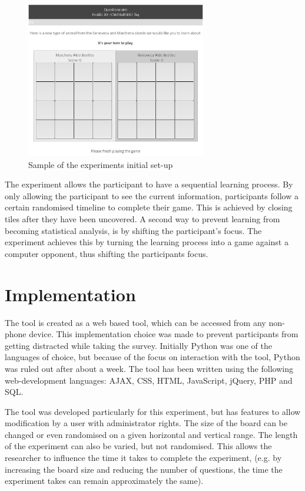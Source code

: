 \documentclass[twoside]{uva-inf-bachelor-thesis}
\theoremstyle{definition}
\begin{document}
\begin{figure}[h]
    \centering
    \includegraphics[width=0.7\textwidth]{Project/Thesis/LaTeX/images/uva_gen_example1.JPG}
    \caption{Sample of the experiments initial set-up}
    \label{fig:example_initiated_game}
\end{figure}
The experiment allows the participant to have a sequential learning process. By only allowing the participant to see the current information, participants follow a certain randomised timeline to complete their game. This is achieved by closing tiles after they have been uncovered. A second way to prevent learning from becoming statistical analysis, is by shifting the participant's focus. The experiment achieves this by turning the learning process into a game against a computer opponent, thus shifting the participants focus.

\section{Implementation}
The tool is created as a web based tool, which can be accessed from any non-phone device. This implementation choice was made to prevent participants from getting distracted while taking the survey. Initially Python was one of the languages of choice, but because of the focus on interaction with the tool, Python was ruled out after about a week. The tool has been written using the following web-development languages: AJAX, CSS, HTML, JavaScript, jQuery, PHP and SQL. 

The tool was developed particularly for this experiment, but has features to allow modification by a user with administrator rights. The size of the board can be changed or even randomised on a given horizontal and vertical range. The length of the experiment can also be varied, but not randomised. This allows the researcher to influence the time it takes to complete the experiment, (e.g. by increasing the board size and reducing the number of questions, the time the experiment takes can remain approximately the same).
\end{document}
